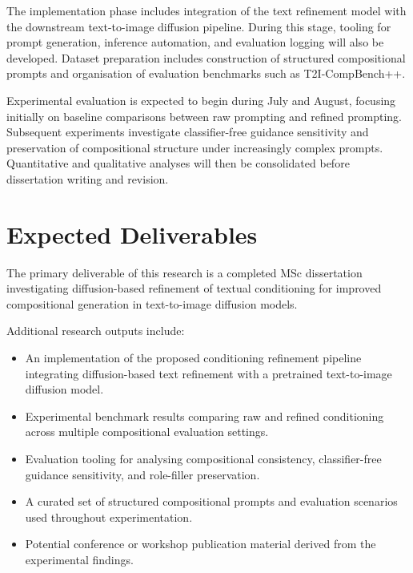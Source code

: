 \documentclass[a4paper,twoside,12pt]{report}
\begin{document}
The implementation phase includes integration of the text refinement model with the downstream text-to-image diffusion pipeline. During this stage, tooling for prompt generation, inference automation, and evaluation logging will also be developed. Dataset preparation includes construction of structured compositional prompts and organisation of evaluation benchmarks such as T2I-CompBench++.

Experimental evaluation is expected to begin during July and August, focusing initially on baseline comparisons between raw prompting and refined prompting. Subsequent experiments investigate classifier-free guidance sensitivity and preservation of compositional structure under increasingly complex prompts. Quantitative and qualitative analyses will then be consolidated before dissertation writing and revision.

\section{Expected Deliverables}

The primary deliverable of this research is a completed MSc dissertation investigating diffusion-based refinement of textual conditioning for improved compositional generation in text-to-image diffusion models.

Additional research outputs include:

\begin{itemize}
    \item An implementation of the proposed conditioning refinement pipeline integrating diffusion-based text refinement with a pretrained text-to-image diffusion model.
    
    \item Experimental benchmark results comparing raw and refined conditioning across multiple compositional evaluation settings.
    
    \item Evaluation tooling for analysing compositional consistency, classifier-free guidance sensitivity, and role-filler preservation.
    
    \item A curated set of structured compositional prompts and evaluation scenarios used throughout experimentation.
    
    \item Potential conference or workshop publication material derived from the experimental findings.
\end{itemize}
\end{document}
